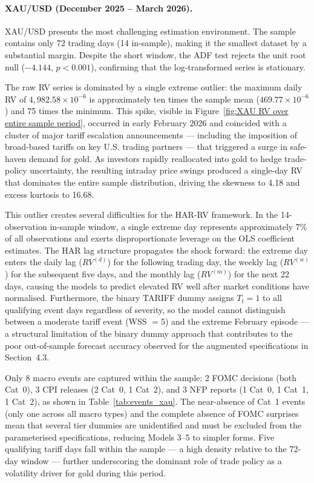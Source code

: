 \documentclass[12pt,a4paper]{report}
\begin{document}

\paragraph{XAU/USD (December 2025 -- March 2026).}
XAU/USD presents the most challenging estimation environment. The sample contains only 72 trading days (14 in-sample), making it the smallest dataset by a substantial margin. Despite the short window, the ADF test rejects the unit root null ($-4.144$, $p < 0.001$), confirming that the log-transformed series is stationary.

The raw RV series is dominated by a single extreme outlier: the maximum daily RV of $4{,}982.58 \times 10^{-6}$ is approximately ten times the sample mean ($469.77 \times 10^{-6}$) and 75 times the minimum. This spike, visible in Figure~\ref{fig:XAU RV over entire sample period}, occurred in early February 2026 and coincided with a cluster of major tariff escalation announcements --- including the imposition of broad-based tariffs on key U.S. trading partners --- that triggered a surge in safe-haven demand for gold. As investors rapidly reallocated into gold to hedge trade-policy uncertainty, the resulting intraday price swings produced a single-day RV that dominates the entire sample distribution, driving the skewness to 4.18 and excess kurtosis to 16.68.

This outlier creates several difficulties for the HAR-RV framework. In the 14-observation in-sample window, a single extreme day represents approximately 7\% of all observations and exerts disproportionate leverage on the OLS coefficient estimates. The HAR lag structure propagates the shock forward: the extreme day enters the daily lag ($RV^{(d)}$) for the following trading day, the weekly lag ($RV^{(w)}$) for the subsequent five days, and the monthly lag ($RV^{(m)}$) for the next 22 days, causing the models to predict elevated RV well after market conditions have normalised. Furthermore, the binary TARIFF dummy assigns $T_t = 1$ to all qualifying event days regardless of severity, so the model cannot distinguish between a moderate tariff event (WSS $= 5$) and the extreme February episode --- a structural limitation of the binary dummy approach that contributes to the poor out-of-sample forecast accuracy observed for the augmented specifications in Section~4.3.

Only 8 macro events are captured within the sample: 2 FOMC decisions (both Cat~0), 3 CPI releases (2 Cat~0, 1 Cat~2), and 3 NFP reports (1 Cat~0, 1 Cat~1, 1 Cat~2), as shown in Table~\ref{tab:events_xau}. The near-absence of Cat~1 events (only one across all macro types) and the complete absence of FOMC surprises mean that several tier dummies are unidentified and must be excluded from the parameterised specifications, reducing Models 3--5 to simpler forms. Five qualifying tariff days fall within the sample --- a high density relative to the 72-day window --- further underscoring the dominant role of trade policy as a volatility driver for gold during this period.
\end{document}
